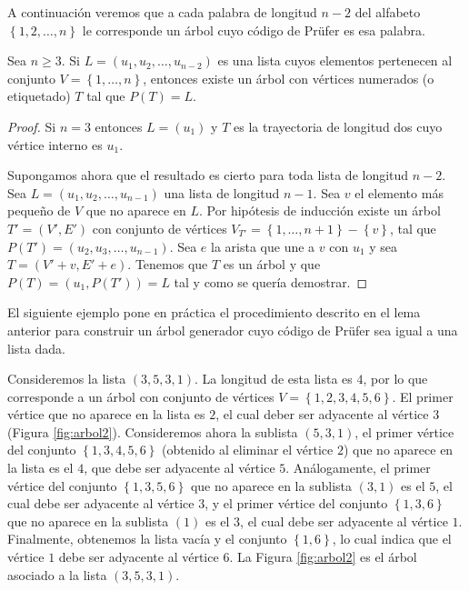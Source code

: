 A continuación veremos que a cada palabra de longitud $n-2$ del alfabeto $\left\lbrace 1,2,\dots,n \right\rbrace$ le corresponde un árbol cuyo código de Prüfer es esa palabra.

\begin{proposition}\label{prop:3}
Sea $n \geq 3$. Si $L = (u_1,u_2,\dots,u_{n-2})$ es una lista cuyos elementos pertenecen al conjunto $V = \left\lbrace 1,\dots,n\right\rbrace$, entonces existe un árbol con vértices numerados (o etiquetado) $T$ tal que $P(T) = L$.
\end{proposition}

\begin{proof}
Si $n=3$ entonces $L = (u_1)$ y $T$ es la trayectoria de longitud dos cuyo vértice interno es $u_1$.

Supongamos ahora que el resultado es cierto para toda lista de longitud $n-2$. Sea $L = (u_1,u_2,\dots,u_{n-1})$ una lista de longitud $n-1$. Sea $v$ el elemento más pequeño de $V$ que no aparece en $L$. Por hipótesis de inducción existe un árbol $T' = (V',E')$ con conjunto de vértices $V_{T'} = \left\lbrace 1,\dots,n+1 \right\rbrace - \left\lbrace v \right\rbrace$, tal que $P(T') = (u_2,u_3,\dots,u_{n-1})$. Sea $e$ la arista que une a $v$ con $u_1$ y sea $T = (V' + v, E' + e)$. Tenemos que $T$ es un árbol y que $P(T) = (u_1,P(T')) = L$ tal y como se quería demostrar.
\end{proof}

El siguiente ejemplo pone en práctica el procedimiento descrito en el lema anterior para construir un árbol generador cuyo código de Prüfer sea igual a una lista dada.

\begin{exampleth}
Consideremos la lista $(3,5,3,1)$. La longitud de esta lista es $4$, por lo que corresponde a un árbol con conjunto de vértices $V = \left\lbrace 1,2,3,4,5,6 \right\rbrace$. El primer vértice que no aparece en la lista es $2$, el cual deber ser adyacente al vértice $3$ (Figura \ref{fig:arbol2}). Consideremos ahora la sublista $(5,3,1)$, el primer vértice del conjunto $\left\lbrace 1,3,4,5,6 \right\rbrace$ (obtenido al eliminar el vértice $2$) que no aparece en la lista es el $4$, que debe ser adyacente al vértice $5$. Análogamente, el primer vértice del conjunto $\left\lbrace 1,3,5,6 \right\rbrace$ que no aparece en la sublista $(3,1)$ es el $5$, el cual debe ser adyacente al vértice $3$, y el primer vértice del conjunto $\left\lbrace 1,3,6 \right\rbrace$ que no aparece en la sublista $(1)$ es el $3$, el cual debe ser adyacente al vértice $1$. Finalmente, obtenemos la lista vacía y el conjunto $\left\lbrace 1,6 \right\rbrace$, lo cual indica que el vértice $1$ debe ser adyacente al vértice $6$. La Figura \ref{fig:arbol2} es el árbol asociado a la lista $(3,5,3,1)$.
\end{exampleth}

